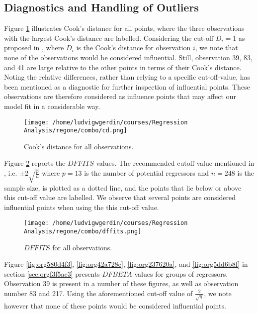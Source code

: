 \documentclass[11pt]{article}
\begin{document}
\subsection{Diagnostics and Handling of Outliers}
\label{sec:org7e5005a}

Figure \ref{fig:org218708f} illustrates Cook's distance for all points, where the three observations with the largest 
Cook's distance are labelled. Considering the cut-off \(D_i = 1\) as proposed in \cite{Montgomery2012}, 
where \(D_i\) is the Cook's distance for observation \(i\), we note that none of the observations would be 
considered influential. Still, observation 39, 83, and 41 are large relative
to the other points in terms of their Cook's distance. Noting the relative differences, rather 
than relying to a specific cut-off-value, has been mentioned as a diagnostic for further
inspection of influential points. \cite{Fox1991} These observations are therefore considered as influence
points that may affect our model fit in a considerable way.

\begin{figure}[h]
\centering
\texttt{[image: /home/ludvigwgerdin/courses/Regression Analysis/regone/combo/cd.png]}
\caption{\label{fig:org218708f}
Cook's distance for all observations.}
\end{figure}

Figure \ref{fig:org7f586d4} reports the \(DFFITS\) values. 
The recommended cutoff-value mentioned in \cite{Montgomery2012}, i.e. \(\pm 2\sqrt{\frac{p}{n}}\)
where \(p = 13\) is the number of potential regressors and \(n = 248\) is the sample size, is 
plotted as a dotted line, and the points that lie below or above this cut-off value are labelled.
We observe that several points are considered influential points when using the this cut-off value.

\begin{figure}[h]
\centering
\texttt{[image: /home/ludvigwgerdin/courses/Regression Analysis/regone/combo/dffits.png]}
\caption{\label{fig:org7f586d4}
\(DFFITS\) for all observations.}
\end{figure}

Figure \ref{fig:org580d4f3}, \ref{fig:org42a728e}, \ref{fig:org237620a}, and
\ref{fig:org5dd6b8f} in section \ref{sec:orgf3f5ac3} presents \(DFBETA\) values for groups of regressors. 
Observation 39 is present in a number of these figures, as well as observation number 83 and 217. 
Using the aforementioned cut-off value of \(\frac{2}{\sqrt{n}}\), we note however that none of these points
would be considered influential points.
\end{document}
